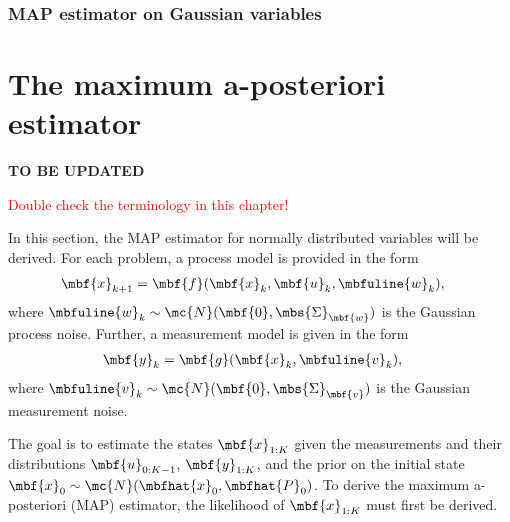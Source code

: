 \subsubsection{MAP estimator on Gaussian variables}

\section{The maximum a-posteriori estimator}
\begin{center}
    \Huge
    \textbf{TO BE UPDATED}
    
    \textcolor{red}{
    Double check the terminology in this chapter!
    }
\end{center}

In this section, the MAP estimator for normally distributed variables will be derived. For each problem, a process model is provided in the form 
\begin{align}
\mbf{x}_{k+1} &= \mbf{f}(\mbf{x}_{k}, \mbf{u}_{k}, \mbfuline{w}_{k}),
\end{align}
where $\mbfuline{w}_{k}\sim\mc{N}(\mbf{0},\mbs{\Sigma}_{\mbf{w}})$ is the Gaussian process noise.
Further, a measurement model is given in the form
\begin{align}
\mbf{y}_{k} &= \mbf{g}(\mbf{x}_{k}, \mbfuline{v}_{k}),
\end{align}
where $\mbfuline{v}_{k}\sim\mc{N}(\mbf{0},\mbs{\Sigma}_{\mbf{v}})$ is the Gaussian measurement noise. 

The goal is to estimate the states $\mbf{x}_{1:K}$ given the measurements and their distributions $\mbf{u}_{0:K-1}$, $\mbf{y}_{1:K}$, and the prior on the initial state $\mbf{x}_{0}\sim\mc{N}(\mbfhat{x}_{0},\mbfhat{P}_{0})$. To derive the maximum a-posteriori (MAP) estimator, the likelihood of $\mbf{x}_{1:K}$ must first be derived. 

